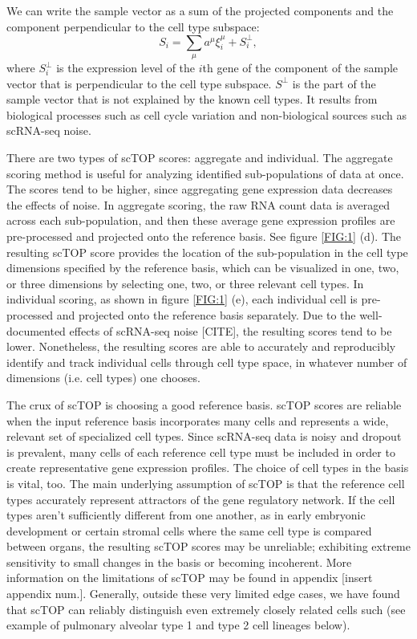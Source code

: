 \documentclass[aps,superscriptaddress, notitlepage,longbibliography]{revtex4-1}
\def\be{\begin{equation}}
\def\ee{\end{equation}}
\begin{document}
We can write the sample vector as a sum of the projected components and the component perpendicular to the cell type subspace: 
\be
S_i = \sum_\mu a^{\mu} \xi^{\mu}_i + S^{\perp}_i,
\ee
where $S^{\perp}_i$ is the expression level of the $i$th gene of the component of the sample vector that is perpendicular to the cell type subspace. $S^{\perp}$ is the part of the sample vector that is not explained by the known cell types. It results from biological processes such as cell cycle variation and non-biological sources such as scRNA-seq noise. 

There are two types of scTOP scores: aggregate and individual. The aggregate scoring method is useful for analyzing identified sub-populations of data at once. The scores tend to be higher, since aggregating gene expression data decreases the effects of noise. In aggregate scoring, the raw RNA count data is averaged across each sub-population, and then these average gene expression profiles are pre-processed and projected onto the reference basis. See figure \ref{FIG:1} (d). The resulting scTOP score provides the location of the sub-population in the cell type dimensions specified by the reference basis, which can be visualized in one, two, or three dimensions by selecting one, two, or three relevant cell types. In individual scoring, as shown in figure \ref{FIG:1} (e), each individual cell is pre-processed and projected onto the reference basis separately. Due to the well-documented effects of scRNA-seq noise [CITE], the resulting scores tend to be lower. Nonetheless, the resulting scores are able to accurately and reproducibly identify and track individual cells through cell type space, in whatever number of dimensions (i.e. cell types) one chooses.

The crux of scTOP is choosing a good reference basis. scTOP scores are reliable when the input reference basis incorporates many cells and represents a wide, relevant set of specialized cell types. Since scRNA-seq data is noisy and dropout is prevalent, many cells of each reference cell type must be included in order to create representative gene expression profiles. The choice of cell types in the basis is vital, too. The main underlying assumption of scTOP is that the reference cell types accurately represent attractors of the gene regulatory network. If the cell types aren't sufficiently different from one another, as in early embryonic development or certain stromal cells where the same cell type is compared between organs, the resulting scTOP scores may be unreliable; exhibiting extreme sensitivity to small changes in the basis or becoming incoherent. More information on the limitations of scTOP may be found in appendix [insert appendix num.]. Generally, outside these very limited edge cases, we have found that scTOP can reliably distinguish even extremely closely related cells such (see example of pulmonary alveolar type 1 and type 2 cell lineages below).
\end{document}
